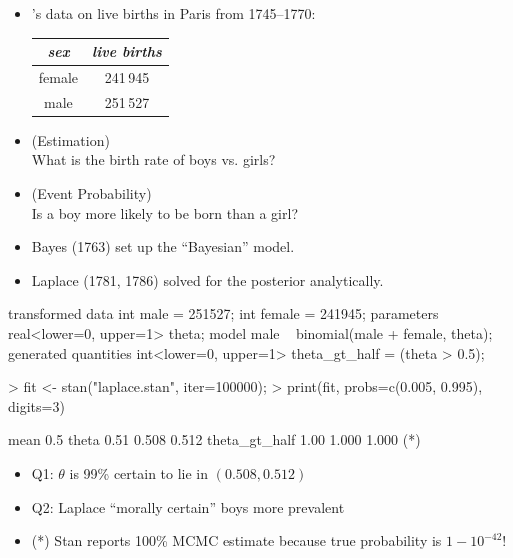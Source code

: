 \documentclass[10pt]{report}
\begin{document}
\begin{itemize}
\item {}'s data on live births in Paris from 1745--1770:
\vspace*{-4pt}
\begin{center}\small
\begin{tabular}{c|c}
{\slshape sex} & {\slshape live births}
\\ \hline
female & 241\,945
\\
male & 251\,527
\end{tabular}
\end{center}
\item {} (Estimation)
\\
What is the birth rate of boys vs. girls?

\item {} (Event Probability)
\\
Is a boy more likely to be born than a girl?
%
\item Bayes (1763) set up the ``Bayesian'' model.
\item Laplace (1781, 1786) solved for the posterior analytically.
\end{itemize}
  
%
\begin{stancode}
transformed data {
  int male = 251527;
  int female = 241945;
}
parameters {
  real<lower=0, upper=1> theta;
}
model {
  male ~ binomial(male + female, theta);
}
generated quantities {
  int<lower=0, upper=1> theta_gt_half = (theta > 0.5);
}
\end{stancode}

%
\begin{codein}
> fit <- stan("laplace.stan", iter=100000);
> print(fit, probs=c(0.005, 0.995), digits=3)
\end{codein}
\begin{codeout}
                    mean   0.5%
theta               0.51  0.508  0.512
theta_gt_half       1.00  1.000  1.000 (*)
\end{codeout}
%
\begin{itemize}
\item Q1: $\theta$ is 99\% certain to lie in $(0.508, 0.512)$
%
\item Q2:  Laplace ``morally certain'' boys more prevalent
  \vfill
\item (*) Stan reports 100\% MCMC estimate because true probability is $1 - 10^{-42}$!
\end{itemize}
\end{document}
